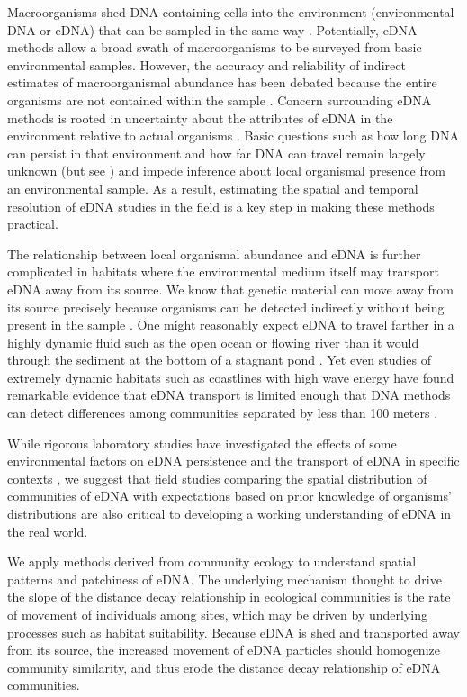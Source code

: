 \documentclass[11pt,letterpaper]{article} %
\begin{document}
Macroorganisms shed DNA-containing cells into the environment (environmental DNA or eDNA) that can be sampled in the same way  \citep{Ficetola2008,Thomsen2012}. Potentially, eDNA methods allow a broad swath of macroorganisms to be surveyed from basic environmental samples. However, the accuracy and reliability of indirect estimates of macroorganismal abundance has been debated because the entire organisms are not contained within the sample \citep{Cowart2015}. Concern surrounding eDNA methods is rooted in uncertainty about the attributes of eDNA in the environment relative to actual organisms \citep{Shelton2016, Evans2016}. Basic questions such as how long DNA can persist in that environment and how far DNA can travel remain largely unknown (but see \cite{Klymus2015,Turner2015,Strickler2015,Deiner2014}) and impede inference about local organismal presence from an environmental sample. As a result, estimating the spatial and temporal resolution of eDNA studies in the field is a key step in making these methods practical.


The relationship between local organismal abundance and eDNA is further complicated in habitats where the environmental medium itself may transport eDNA away from its source. We know that genetic material can move away from its source precisely because organisms can be detected indirectly without being present in the sample \citep{Kelly2016}. One might reasonably expect eDNA to travel farther in a highly dynamic fluid such as the open ocean or flowing river than it would through the sediment at the bottom of a stagnant pond \citep{Deiner2014, Shogren2016}. Yet even studies of extremely dynamic habitats such as coastlines with high wave energy have found remarkable evidence that eDNA transport is limited enough that DNA methods can detect differences among communities separated by less than 100 meters \citep{Port2016}.


While rigorous laboratory studies have investigated the effects of some environmental factors on eDNA persistence \citep{Klymus2015, Barnes2014, Sassoubre2016} and the transport of eDNA in specific contexts \citep{Deiner2014}, we suggest that field studies comparing the spatial distribution of communities of eDNA with expectations based on prior knowledge of organisms' distributions are also critical to developing a working understanding of eDNA in the real world.


We apply methods derived from community ecology to understand spatial patterns and patchiness of eDNA. The underlying mechanism thought to drive the slope of the distance decay relationship in ecological communities is the rate of movement of individuals among sites, which may be driven by underlying processes such as habitat suitability. Because eDNA is shed and transported away from its source, the increased movement of eDNA particles should homogenize community similarity, and thus erode the distance decay relationship of eDNA communities.
\end{document}
